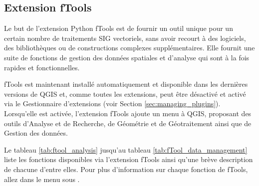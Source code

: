 
\subsection{Extension fTools}\label{sec:ftools}


Le but de l'extension Python fTools est de fournir un outil unique pour un certain nombre de traitements SIG vectoriels, sans avoir recourt à des logiciels, des bibliothèques ou de constructions complexes supplémentaires. Elle fournit une suite de fonctions de gestion des données spatiales et d'analyse qui sont à la fois rapides et fonctionnelles.

fTools est maintenant installé automatiquement et disponible dans les dernières versions de QGIS et, comme toutes les extensions, peut être désactivé et activé via le Gestionnaire d'extensions (voir Section \ref{sec:managing_plugins}). Lorsqu'elle est activée, l'extension fTools ajoute un menu  à QGIS, proposant des outils d'Analyse et de Recherche, de Géométrie et de Géotraitement ainsi que de Gestion des données.

\label{ftool_functions}

Le tableau \ref{tab:ftool_analysis} jusqu'au tableau \ref{tab:fTool_data_management} liste les fonctions disponibles via l'extension fTools ainsi qu'une brève description de chacune d'entre elles. Pour plus d'information sur chaque fonction de fTools, allez dans le menu  sous .

